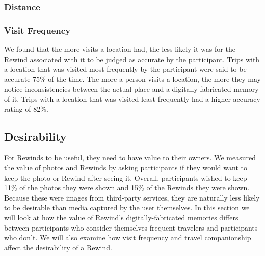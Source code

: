 \documentclass{sigchi}
\begin{document}
\subsubsection{Distance}


\subsubsection{Visit Frequency}
We found that the more visits a location had, the less likely it was for the Rewind associated with it to be judged as accurate by the participant. Trips with a location that was visited most frequently by the participant were said to be accurate 75\% of the time. The more a person visits a location, the more they may notice inconsistencies between the actual place and a digitally-fabricated memory of it. Trips with a location that was visited least frequently had a higher accuracy rating of 82\%.



\subsection{Desirability}
For Rewinds to be useful, they need to have value to their owners. We measured the value of photos and Rewinds by asking participants if they would want to keep the photo or Rewind after seeing it. Overall, participants wished to keep 11\% of the photos they were shown and 15\% of the Rewinds they were shown. Because these were images from third-party services, they are naturally less likely to be desirable than media captured by the user themselves. In this section we will look at how the value of Rewind's digitally-fabricated memories differs between participants who consider themselves frequent travelers and participants who don't. We will also examine how visit frequency and travel companionship affect the desirability of a Rewind.
\end{document}
